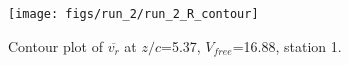 \begin{figure}[H]
\centering
\texttt{[image: figs/run\_2/run\_2\_R\_contour]}
\caption{Contour plot of $\overline{v_{r}}$ at $z/c$=5.37, $V_{free}$=16.88, station 1.}
\label{fig:run_2_R_contour}
\end{figure}


